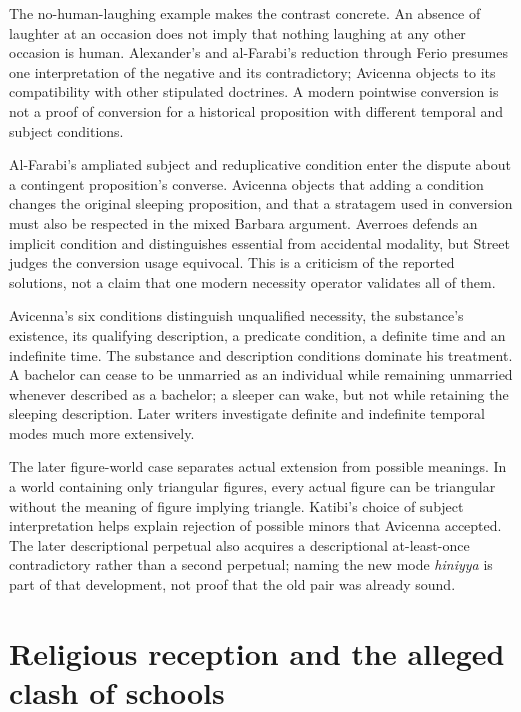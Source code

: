 The no-human-laughing example makes the contrast
concrete. An absence of laughter at an occasion
does not imply that nothing laughing at any
other occasion is human. Alexander's and
al-Farabi's reduction through Ferio presumes
one interpretation of the negative and its
contradictory; Avicenna objects to its compatibility
with other stipulated doctrines. A modern
pointwise conversion is not a proof of conversion
for a historical proposition with different
temporal and subject conditions.
\cite[pp.~548--549]{Street2004ArabicLogicHHL}

Al-Farabi's ampliated subject and reduplicative
condition enter the dispute about a contingent
proposition's converse. Avicenna objects that
adding a condition changes the original sleeping
proposition, and that a stratagem used in
conversion must also be respected in the mixed
Barbara argument. Averroes defends an implicit
condition and distinguishes essential from
accidental modality, but Street judges the
conversion usage equivocal. This is a criticism
of the reported solutions, not a claim that
one modern necessity operator validates all of them.
\cite[pp.~549--552, 563--564]{Street2004ArabicLogicHHL}

Avicenna's six conditions distinguish unqualified
necessity, the substance's existence, its qualifying
description, a predicate condition, a definite
time and an indefinite time. The substance and
description conditions dominate his treatment.
A bachelor can cease to be unmarried as an
individual while remaining unmarried whenever
described as a bachelor; a sleeper can wake,
but not while retaining the sleeping description.
Later writers investigate definite and indefinite
temporal modes much more extensively.
\cite[pp.~550--552]{Street2004ArabicLogicHHL}

The later figure-world case separates actual
extension from possible meanings. In a world
containing only triangular figures, every actual
figure can be triangular without the meaning
of figure implying triangle. Katibi's choice
of subject interpretation helps explain rejection
of possible minors that Avicenna accepted. The
later descriptional perpetual also acquires a
descriptional at-least-once contradictory rather
than a second perpetual; naming the new mode
\emph{hiniyya} is part of that development,
not proof that the old pair was already sound.
\cite[pp.~574--576]{Street2004ArabicLogicHHL}

\section{Religious reception and the alleged clash of schools}
\label{sec:p13-street-2004-reception-schools}

